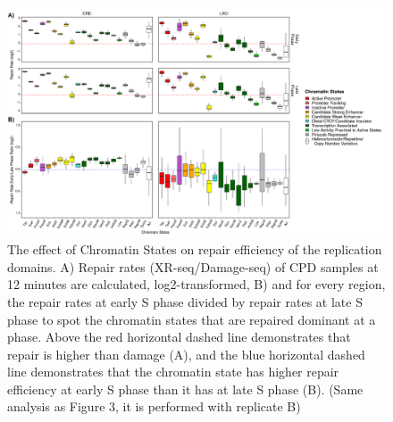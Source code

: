 \begin{figure}[H]
\begin{center}
\includegraphics[width=\textwidth]{Chapters/7_appendix/figures/supfig15}
\caption[The effect of Chromatin States on repair efficiency of the replication domains for CPD samples at 12 minutes (replicate B).]{The effect of Chromatin States on repair efficiency of the replication domains. A) Repair rates (XR-seq/Damage-seq) of CPD samples at 12 minutes are calculated, log2-transformed, B) and for every region, the repair rates at early S phase divided by repair rates at late S phase to spot the chromatin states that are repaired dominant at a phase. Above the red horizontal dashed line demonstrates that repair is higher than damage (A), and the blue horizontal dashed line demonstrates that the chromatin state has higher repair efficiency at early S phase than it has at late S phase (B). (Same analysis as Figure 3, it is performed with replicate B)}
\label{supfig:chromatin3}
\end{center}
\end{figure}

